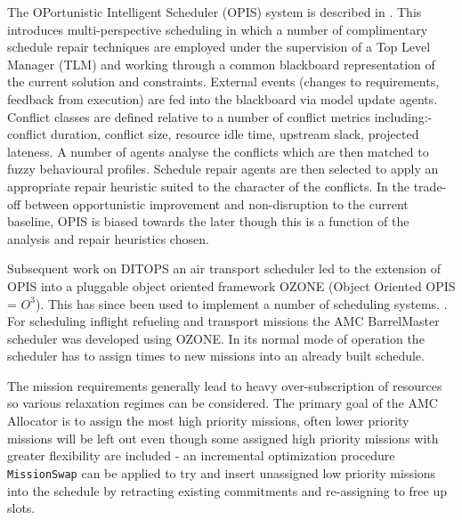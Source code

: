 \documentclass[12pt,a4paper]{article}
\begin{document}
The OPortunistic Intelligent Scheduler (OPIS) system is described in \citep{smith95reactive}. This introduces multi-perspective scheduling in which a number of complimentary schedule repair techniques are employed under the supervision of a Top Level Manager (TLM) and working through a common blackboard representation of the current solution and constraints. External events (changes to requirements, feedback from execution) are fed into the blackboard via model update agents. Conflict classes are defined relative to a number of conflict metrics including:- conflict duration, conflict size, resource idle time, upstream slack, projected lateness. A number of agents analyse the conflicts which are then matched to fuzzy behavioural profiles. Schedule repair agents are then selected to apply an appropriate repair heuristic suited to the character of the conflicts. In the trade-off between opportunistic improvement and non-disruption to the current baseline, OPIS is biased towards the later though this is a function of the analysis and repair heuristics chosen. 

Subsequent work on DITOPS \citep{smith96mixed} an air transport scheduler led to the extension of OPIS into a pluggable object oriented framework OZONE (Object Oriented OPIS = $O^3$). This has since been used to implement a number of scheduling systems. .
For scheduling inflight refueling and transport missions the AMC BarrelMaster scheduler \citep{smith04continuous} was developed using OZONE. In its normal mode of operation the scheduler has to assign times to new missions into an already built schedule. 

The mission requirements generally lead to heavy over-subscription of resources so various relaxation regimes can be considered.%
 The primary goal of the AMC Allocator is to assign the most high priority missions, often lower priority missions will be left out even though some assigned high priority missions with greater flexibility are included - an incremental optimization procedure \texttt{MissionSwap} can be applied to try and insert unassigned low priority missions into the schedule by retracting existing commitments and re-assigning to free up slots. 
\end{document}
